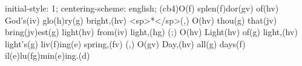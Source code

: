 initial-style: 1;
centering-scheme: english;
(cb4)O(f) splen(f)dor(gv) of(hv) God's(iv) glo(h)ry(g) bright,(hv) <sp>*</sp>(,)
O(hv) thou(g) that(jv) bring(jv)est(g) light(hv) from(iv) light,(hg) (;)
O(hv) Light(hv) of(g) light,(hv) light's(g) liv(f)ing(e) spring,(fv) (,)
O(gv) Day,(hv) all(g) days(f) il(e)lu(fg)min(e)ing.(d)
